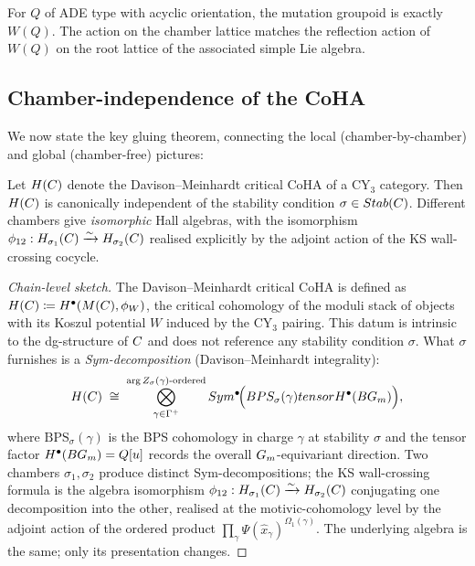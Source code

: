 \begin{corollary}
  \label{cor:weyl-chamber-action}
  For $Q$ of ADE type with acyclic orientation, the mutation groupoid is
  exactly $W(Q)$. The action on the chamber lattice matches the reflection
  action of $W(Q)$ on the root lattice of the associated simple Lie algebra.
\end{corollary}

\subsection{Chamber-independence of the CoHA}

We now state the key gluing theorem, connecting the local (chamber-by-chamber)
and global (chamber-free) pictures:

\begin{theorem}
  \label{thm:coha-chamber-independent}
  Let $H(C)$ denote the Davison--Meinhardt critical CoHA of a CY$_3$
  category. Then $H(C)$ is canonically independent of the stability
  condition $\sigma \in Stab(C)$. Different chambers give
  \emph{isomorphic} Hall algebras, with the isomorphism
  $\phi_{12} : H_{\sigma_1}(C) \xrightarrow{\sim} H_{\sigma_2}(C)$
  realised explicitly by the adjoint action of the KS wall-crossing
  cocycle.
\end{theorem}

\begin{proof}[Chain-level sketch]
  The Davison--Meinhardt critical CoHA \cite{DavisonMeinhardt2020} is
  defined as
  $H(C) \coloneqq H^\bullet(M(C), \phi_W)$,
  the critical cohomology of the moduli stack of objects with its
  Koszul potential $W$ induced by the CY$_3$ pairing. This datum is
  intrinsic to the dg-structure of $C$ and does not reference any
  stability condition $\sigma$. What $\sigma$ furnishes is a
  \emph{Sym-decomposition} (Davison--Meinhardt integrality):
  \[
    H(C) \;\cong\; \bigotimes_{\gamma \in \Gamma^+}^{\arg Z_\sigma(\gamma)\text{-ordered}}
      Sym^\bullet\!\Big(BPS_\sigma(\gamma) tensor H^\bullet(B G_m)\Big),
  \]
  where $\mathrm{BPS}_\sigma(\gamma)$ is the BPS cohomology in charge
  $\gamma$ at stability $\sigma$ and the tensor factor $H^\bullet(B G_m) = Q[u]$
  records the overall $G_m$-equivariant direction. Two chambers
  $\sigma_1, \sigma_2$ produce distinct Sym-decompositions; the
  KS wall-crossing formula is the algebra isomorphism
  $\phi_{12} : H_{\sigma_1}(C) \xrightarrow{\sim} H_{\sigma_2}(C)$
  conjugating one decomposition into the other, realised at the
  motivic-cohomology level by the adjoint action of the ordered product
  $\prod_\gamma \Psi(\hat{x}_\gamma)^{\Omega_1(\gamma)}$. The underlying
  algebra is the same; only its presentation changes.
\end{proof}

